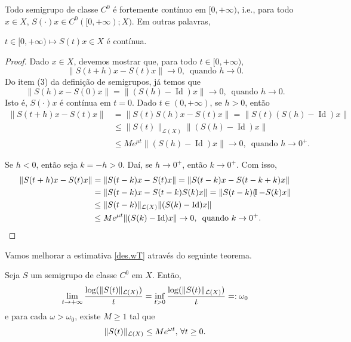 \begin{corollary}\label{Scontinua}
Todo semigrupo de classe $C^0$ é fortemente contínuo em $[0,+\infty)$, i.e., 
para todo $x\in X$, $S(\cdot)x\in C^0([0,+\infty);X)$. Em outras palavras,
\begin{center}
$t\in [0,+\infty)\longmapsto S(t)x\in  X$ é contínua.
\end{center}
\end{corollary}

\begin{proof}
    Dado $x\in X$, devemos mostrar que, para todo $t\in [0,+\infty)$,
    \[\|S(t+h)x-S(t)x\|\to 0,\, \text{ quando } h\to 0.\]
Do item (3) da definição de semigrupos, já temos que
  \[\|S(h)x-S(0)x\|=\|(S(h)-\operatorname{Id})x\|\to 0,\, \text{ quando } h\to 0.\]
Isto é, $S(\cdot)x$ é contínua em $t=0$. Dado $t\in (0,+\infty)$, se $h>0$, então
\begin{align*}
    \|S(t+h)x-S(t)x\|& =\|S(t)S(h)x-S(t)x\|=\|S(t)(S(h)-\operatorname{Id})x\|\\
    & \leq \|S(t)\|_{\mathcal{L}(X)}\|(S(h)-\operatorname{Id})x\|\\
    & \leq Me^{\mu t}\|(S(h)-\operatorname{Id})x\|\to 0,\, \text{ quando } h\to 0^+.
\end{align*}

Se $h<0$, então seja $k=-h>0$. Daí, se $h\to 0^+$, então $k\to0^+$. Com isso,
\begin{align*}
    \|S(t+h)x-S(t)x\|& = \|S(t-k)x-S(t)x\|=\|S(t-k)x-S(t-k+k)x\|\\
    & =\|S(t-k)x-S(t-k)S(k)x\|=\|S(t-k)(\operatorname{\!I}-S(k)x\|\\
    & \leq \|S(t-k)\|_{\mathcal{L}(X)}\|(S(k)-\operatorname{Id})x\|\\
    & \leq Me^{\mu t}\|(S(k)-\operatorname{Id})x\|\to 0,\, \text{ quando } k\to 0^+.
\end{align*}
\end{proof}

Vamos melhorar a estimativa \eqref{des.wT} através do seguinte teorema. 
\begin{theorem}\label{th2.5}
Seja $S$ um semigrupo de classe $C^0$ em $X$. Então,
\[\lim\limits_{t\to +\infty}\frac{\log(\|S(t)\|_{\mathcal{L}(X)})}{t}=\inf\limits_{t>0}\frac{\log(\|S(t)\|_{\mathcal{L}(X)})}{t}=:\omega_0\]
e para cada $\omega>\omega_0$, existe {$M\geq 1$} tal que 
\begin{equation}\label{Sbound}
{\|S(t)\|_{\mathcal{L}(X)}\leq Me^{\omega t},\, \forall t\geq 0.}
\end{equation}
\end{theorem} 


